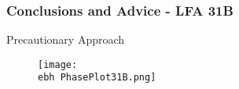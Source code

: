 \documentclass{beamer}
\newcommand{\ebh}{\string~/bio.data/bio.lobster/figures/Assessment/LFA2732/} %
\begin{document}
\begin{frame}
\frametitle{Conclusions and Advice - LFA 31B}
Precautionary Approach
\begin{figure}
        \begin{center}
            \texttt{[image: \\ebh PhasePlot31B.png]}
        \end{center}
    \end{figure}
\end{frame}
\end{document}
